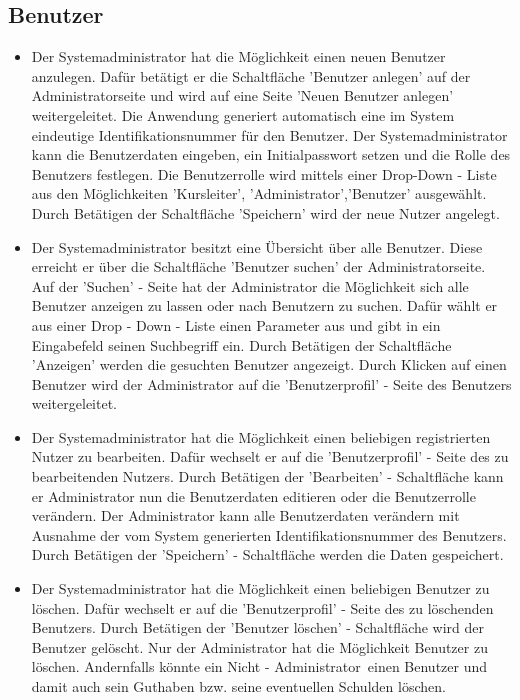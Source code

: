 \documentclass[a4paper]{scrreprt}
\begin{document}
	\subsection{Benutzer}
			\begin{itemize}
				\item {}
					Der Systemadministrator hat die Möglichkeit einen neuen Benutzer anzulegen. Dafür betätigt er die Schaltfläche 'Benutzer anlegen' auf der Administratorseite und wird auf eine Seite 'Neuen Benutzer anlegen' weitergeleitet. 
					Die Anwendung generiert automatisch eine im System eindeutige Identifikationsnummer für den Benutzer. Der Systemadministrator kann die Benutzerdaten eingeben, ein Initialpasswort setzen und die Rolle des Benutzers festlegen. Die Benutzerrolle wird mittels einer Drop-Down - Liste aus den Möglichkeiten 'Kursleiter', 'Administrator','Benutzer' ausgewählt. Durch Betätigen der Schaltfläche 'Speichern' wird der neue Nutzer angelegt.
				\item {}
					Der Systemadministrator besitzt eine Übersicht über alle Benutzer. Diese erreicht er über die Schaltfläche 'Benutzer suchen' der Administratorseite. Auf der 'Suchen' - Seite hat der Administrator die Möglichkeit sich alle Benutzer anzeigen zu lassen oder nach Benutzern zu suchen.  Dafür wählt er aus einer Drop - Down - Liste einen Parameter aus und gibt in ein Eingabefeld seinen Suchbegriff ein. Durch Betätigen der Schaltfläche 'Anzeigen' werden die gesuchten Benutzer angezeigt. Durch Klicken auf einen Benutzer wird der Administrator auf die 'Benutzerprofil' - Seite des Benutzers weitergeleitet.
				\item {}
					Der Systemadministrator hat die Möglichkeit einen beliebigen registrierten Nutzer zu bearbeiten. Dafür wechselt er auf die 'Benutzerprofil' - Seite des zu bearbeitenden Nutzers. Durch Betätigen der 'Bearbeiten' - Schaltfläche kann er Administrator nun die Benutzerdaten editieren oder die Benutzerrolle verändern. Der Administrator kann alle Benutzerdaten verändern mit Ausnahme der vom System generierten Identifikationsnummer des Benutzers. Durch Betätigen der 'Speichern' - Schaltfläche werden die Daten gespeichert.
				\item {}
					Der Systemadministrator hat die Möglichkeit einen beliebigen Benutzer zu löschen. Dafür wechselt er auf die 'Benutzerprofil' - Seite des zu löschenden Benutzers. Durch Betätigen der 'Benutzer löschen' - Schaltfläche wird der Benutzer gelöscht. Nur der Administrator hat die Möglichkeit Benutzer zu löschen. Andernfalls könnte ein \glqq Nicht - Administrator\grqq \ einen Benutzer und damit auch sein Guthaben bzw. seine eventuellen Schulden löschen.

\end{itemize}
\end{document}
